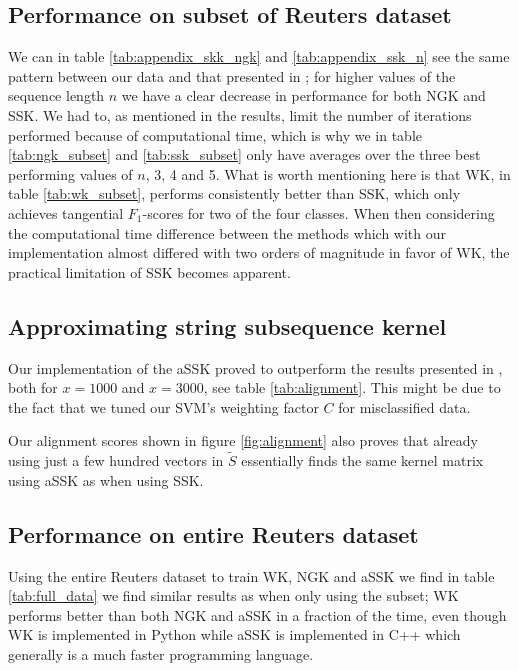 \subsection{Performance on subset of Reuters dataset}
We can in table \ref{tab:appendix_skk_ngk} and \ref{tab:appendix_ssk_n} see the same pattern between our data and that presented in \cite{lodhi}; for higher values of the sequence length $ n $ we have a clear decrease in performance for both NGK and SSK. We had to, as mentioned in the results, limit the number of iterations performed because of computational time, which is why we in table \ref{tab:ngk_subset} and \ref{tab:ssk_subset} only have averages over the three best performing values of $ n $, 3, 4 and 5. What is worth mentioning here is that WK, in table \ref{tab:wk_subset}, performs consistently better than SSK, which only achieves tangential $ F_1 $-scores for two of the four classes. When then considering the computational time difference between the methods which with our implementation almost differed with two orders of magnitude in favor of WK, the practical limitation of SSK becomes apparent. 

\subsection{Approximating string subsequence kernel}
Our implementation of the aSSK proved to outperform the results presented in \cite{lodhi}, both for $ x=1000 $ and $ x=3000 $, see table \ref{tab:alignment}. This might be due to the fact that we tuned our SVM's weighting factor $ C $ for misclassified data. 

Our alignment scores shown in figure \ref{fig:alignment} also proves that already using just a few hundred vectors in $ \tilde{S} $ essentially finds the same kernel matrix using aSSK as when using SSK.

\subsection{Performance on entire Reuters dataset}
Using the entire Reuters dataset to train WK, NGK and aSSK we find in table \ref{tab:full_data} we find similar results as when only using the subset; WK performs better than both NGK and aSSK in a fraction of the time, even though WK is implemented in Python while aSSK is implemented in C++ which generally is a much faster programming language. 


